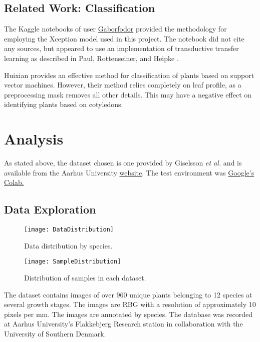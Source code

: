 \documentclass[]{article}
\begin{document}
\subsection{Related Work: Classification}

The Kaggle notebooks of user
\href{https://www.kaggle.com/gaborfodor/seedlings-pretrained-keras-models/data
}{Gaborfodor} provided the methodology for employing the Xception model used in this project.
The notebook did not cite any sources, but appeared to use an implementation of transductive transfer learning as described in Paul, Rottenseiner, and Heipke \cite{Paul2015}.

Huixian\cite{Huixian2020} provides an effective method for classification of plants based on support vector machines. However, their method relies completely on leaf profile, as a preprocessing mask removes all other details. This may have a negative effect on identifying plants based on cotyledons.

\section{Analysis}

As stated above, the dataset chosen is one provided by Giselsson \emph{et al.}\cite{Giselsson2017} and is available from the Aarhus University 
\href{https://vision.eng.au.dk/plant-seedlings-dataset/}{website}.
The test environment was \href{https://colab.research.google.com/}{Google's Colab.}

\subsection{Data Exploration}

\begin{wrapfigure}{l}{0.5\textwidth}
	\begin{center}
		\texttt{[image: DataDistribution]}
	\end{center}
	\caption{Data distribution by species.}	
	\begin{center}
		\texttt{[image: SampleDistribution]}
	\end{center}
	\caption{Distribution of samples in each dataset.}
\end{wrapfigure}

The dataset contains images of over 960 unique plants belonging to 12 species at several growth stages. 
The images are RBG with a resolution of approximately 10 pixels per mm.
The images are annotated by species.
The database was recorded at Aarhus University's Flakkebjerg Research station in  collaboration with the University of Southern Denmark.
\end{document}
